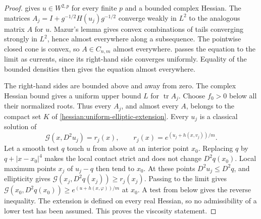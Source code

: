 \begin{proof}
 gives $u\in W^{2,p}$ for every finite $p$ and a bounded
complex Hessian. The matrices
$A_j=I+g^{-1/2}H(u_j)g^{-1/2}$ converge weakly in $L^2$ to the analogous
matrix $A$ for $u$. Mazur's lemma gives convex combinations of tails
converging strongly in $L^2$, hence almost everywhere along a subsequence.
The pointwise closed cone is convex, so $A\in C_{n,m}$ almost everywhere.
 passes the equation to the limit as currents, since its
right-hand side converges uniformly. Equality of the bounded densities
then gives the equation almost everywhere.

The right-hand sides are bounded above and away from zero. The complex
Hessian bound gives a uniform upper bound $L$ for $\operatorname{tr}A_j$.
Choose $f_0>0$ below all their normalized roots. Thus every $A_j$, and
almost every $A$, belongs to the compact set $K$ of \cref{hessian:uniform-elliptic-extension}.
Every $u_j$ is a classical solution of
\[
 \mathcal G(x,D^2u_j)=r_j(x),\qquad
               r_j(x)=e^{(u_j+h(x,v_j))/m}.
\]
Let a smooth test $q$ touch $u$ from above at an
interior point $x_0$. Replacing $q$ by $q+|x-x_0|^4$ makes the local
contact strict and does not change $D^2q(x_0)$. Local maximum points
$x_j$ of $u_j-q$ then tend to $x_0$. At these points $D^2u_j\leq D^2q$,
and ellipticity gives $\mathcal G(x_j,D^2q(x_j))\geq r_j(x_j)$. Passing to
the limit gives $\mathcal G(x_0,D^2q(x_0))\geq e^{(u+h(x,\varphi))/m}$ at
$x_0$. A test from below gives the reverse inequality. The extension is
defined on every real Hessian, so no admissibility of a lower test has
been assumed. This proves the viscosity statement.
\end{proof}
